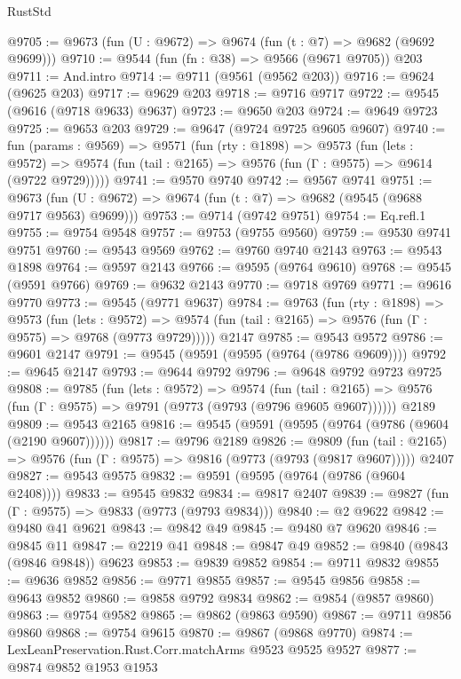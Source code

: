 \begin{lexlean}{RustStd}
\begin{coremodule}
@9705 := @9673 (fun (U : @9672) => @9674 (fun (t : @7) => @9682 (@9692 @9699)))
@9710 := @9544 (fun (fn : @38) => @9566 (@9671 @9705)) @203
@9711 := And.intro
@9714 := @9711 (@9561 (@9562 @203))
@9716 := @9624 (@9625 @203)
@9717 := @9629 @203
@9718 := @9716 @9717
@9722 := @9545 (@9616 (@9718 @9633) @9637)
@9723 := @9650 @203
@9724 := @9649 @9723
@9725 := @9653 @203
@9729 := @9647 (@9724 @9725 @9605 @9607)
@9740 := fun (params : @9569) =>
  @9571
    (fun (rty : @1898) =>
    @9573
      (fun (lets : @9572) =>
      @9574 (fun (tail : @2165) => @9576 (fun (Γ : @9575) => @9614 (@9722 @9729)))))
@9741 := @9570 @9740
@9742 := @9567 @9741
@9751 := @9673 (fun (U : @9672) => @9674 (fun (t : @7) => @9682 (@9545 (@9688 @9717 @9563) @9699)))
@9753 := @9714 (@9742 @9751)
@9754 := Eq.refl.{1}
@9755 := @9754 @9548
@9757 := @9753 (@9755 @9560)
@9759 := @9530 @9741 @9751
@9760 := @9543 @9569
@9762 := @9760 @9740 @2143
@9763 := @9543 @1898
@9764 := @9597 @2143
@9766 := @9595 (@9764 @9610)
@9768 := @9545 (@9591 @9766)
@9769 := @9632 @2143
@9770 := @9718 @9769
@9771 := @9616 @9770
@9773 := @9545 (@9771 @9637)
@9784 := @9763
    (fun (rty : @1898) =>
    @9573
      (fun (lets : @9572) =>
      @9574 (fun (tail : @2165) => @9576 (fun (Γ : @9575) => @9768 (@9773 @9729)))))
    @2147
@9785 := @9543 @9572
@9786 := @9601 @2147
@9791 := @9545 (@9591 (@9595 (@9764 (@9786 @9609))))
@9792 := @9645 @2147
@9793 := @9644 @9792
@9796 := @9648 @9792 @9723 @9725
@9808 := @9785
    (fun (lets : @9572) =>
    @9574
      (fun (tail : @2165) => @9576 (fun (Γ : @9575) => @9791 (@9773 (@9793 (@9796 @9605 @9607))))))
    @2189
@9809 := @9543 @2165
@9816 := @9545 (@9591 (@9595 (@9764 (@9786 (@9604 (@2190 @9607))))))
@9817 := @9796 @2189
@9826 := @9809
    (fun (tail : @2165) => @9576 (fun (Γ : @9575) => @9816 (@9773 (@9793 (@9817 @9607)))))
    @2407
@9827 := @9543 @9575
@9832 := @9591 (@9595 (@9764 (@9786 (@9604 @2408))))
@9833 := @9545 @9832
@9834 := @9817 @2407
@9839 := @9827 (fun (Γ : @9575) => @9833 (@9773 (@9793 @9834)))
@9840 := @2 @9622
@9842 := @9480 @41 @9621
@9843 := @9842 @49
@9845 := @9480 @7 @9620
@9846 := @9845 @11
@9847 := @2219 @41
@9848 := @9847 @49
@9852 := @9840 (@9843 (@9846 @9848)) @9623
@9853 := @9839 @9852
@9854 := @9711 @9832
@9855 := @9636 @9852
@9856 := @9771 @9855
@9857 := @9545 @9856
@9858 := @9643 @9852
@9860 := @9858 @9792 @9834
@9862 := @9854 (@9857 @9860)
@9863 := @9754 @9582
@9865 := @9862 (@9863 @9590)
@9867 := @9711 @9856 @9860
@9868 := @9754 @9615
@9870 := @9867 (@9868 @9770)
@9874 := LexLeanPreservation.Rust.Corr.matchArms @9523 @9525 @9527
@9877 := @9874 @9852 @1953 @1953

\end{coremodule}
\end{lexlean}

